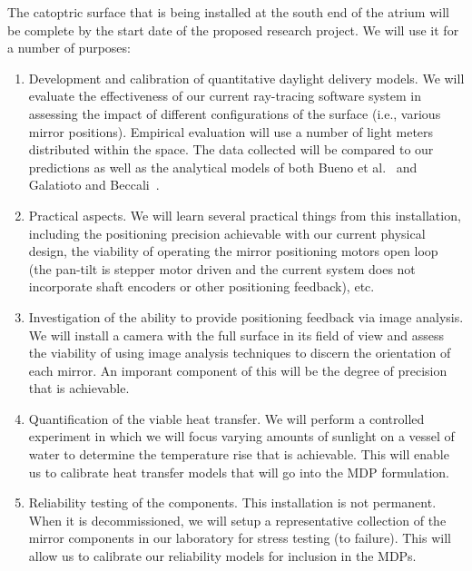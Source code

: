 The catoptric surface that is being installed at the south end of the
atrium will be complete by the start date of the proposed research project.
We will use it for a number of purposes:
\begin{enumerate}

\item Development and calibration of quantitative daylight delivery models.
We will evaluate the effectiveness of our current ray-tracing software
system in assessing the impact of different configurations of the surface
(i.e., various mirror positions).  Empirical evaluation will use a number
of light meters distributed within the space. The data collected will be
compared to our predictions as well as the analytical models
of both Bueno et al.~\cite{bwkk15} and Galatioto and Beccali~\cite{gb16}.

\item Practical aspects.
We will learn several practical things from this installation, including
the positioning precision achievable with our current physical design, the
viability of operating the mirror positioning motors open loop (the pan-tilt
is stepper motor driven and the current system does not incorporate
shaft encoders or other positioning feedback), etc.

\item Investigation of the ability to provide positioning feedback via
image analysis.  We will install a camera with the full surface in its
field of view and assess the viability of using image analysis techniques
to discern the orientation of each mirror.  An imporant component of this
will be the degree of precision that is achievable.

\item Quantification of the viable heat transfer.
We will perform a controlled experiment in which we will focus varying
amounts of sunlight on a vessel of water to determine the temperature
rise that is achievable.  This will enable us to calibrate heat transfer
models that will go into the MDP formulation.

\item Reliability testing of the components.
This installation is not permanent. When it is decommissioned, we will
setup a representative collection of the mirror components in our laboratory
for stress testing (to failure).  This will allow us to calibrate our
reliability models for inclusion in the MDPs.

\end{enumerate}

